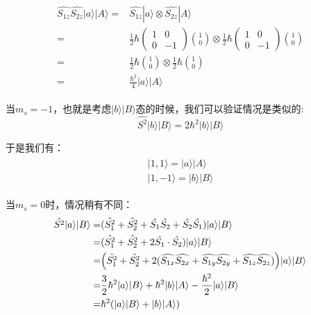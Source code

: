 \begin{align}
    \begin{split}
        \widehat{S_{1z}}\widehat{S_{2z}}|a\rangle|A\rangle=&\widehat{S_{1z}}|a\rangle \otimes \widehat{S_{2z}}|A\rangle\\
        =&\frac{1}{2}\hbar \begin{pmatrix}
        1 & 0\\
        0 & -1
        \end{pmatrix}\binom{1}{0}\otimes \frac{1}{2}\hbar \begin{pmatrix}
        1 & 0\\
        0 & -1
        \end{pmatrix}\binom{1}{0}\\
        =&\frac{1}{2}\hbar\binom{1}{0}\otimes \frac{1}{2}\hbar\binom{1}{0}\\
        =&\frac{\hbar^2}{4}|a\rangle|A\rangle
    \end{split}
\end{align}

当$m_s=-1$，也就是考虑$|b\rangle|B\rangle$态的时候，我们可以验证情况是类似的:
\begin{equation}
    \hat{S^2}|b\rangle|B\rangle=2\hbar^2|b\rangle|B\rangle
\end{equation}

于是我们有：
\begin{align}
    \begin{split}
        |1,1\rangle=|a\rangle|A\rangle\\
        |1,-1\rangle=|b\rangle|B\rangle
    \end{split}
\end{align}

当$m_s=0$时，情况稍有不同：
 \begin{align}\label{equ5:A}
  \begin{split}
      \hat{S^2}|a\rangle|B\rangle=&(\hat{S_1^2}+\hat{S_2^2}+\hat{S_1}\hat{S_2}+\hat{S_2}\hat{S_1})|a\rangle|B\rangle\\
      =&(\hat{S_1^2}+\hat{S_2^2}+2\hat{S_1}\cdot \hat{S_2})|a\rangle|B\rangle\\ 
      =&\Bigl(\hat{S_1^2}+\hat{S_2^2}+2(\widehat{S_{1x}} \widehat{S_{2x}}+\widehat{S_{1y}} \widehat{S_{2y}}+\widehat{S_{1z}} \widehat{S_{2z}})\Bigr)|a\rangle|B\rangle\\
      =&\frac{3}{2}\hbar^2|a\rangle|B\rangle+\hbar^2|b\rangle|A\rangle-\frac{\hbar^2}{2}|a\rangle|B\rangle\\
      =&\hbar^2(|a\rangle|B\rangle+|b\rangle|A\rangle)
  \end{split} 
 \end{align}
 
